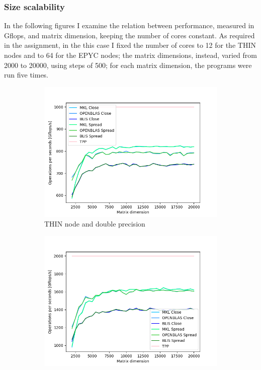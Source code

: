 \documentclass[12pt]{article}
\begin{document}
        
        \subsubsection{Size scalability}
        In the following figures I examine the relation between performance, measured in Gflops, and matrix dimension, keeping the number of cores constant.\newline
        As required in the assignment, in the this case I fixed the number of cores to 12 for the THIN nodes and to 64 for the EPYC nodes; the matrix dimensions, instead, varied from 2000 to 20000, using steps of 500; for each matrix dimension, the programs were run five times.

        \begin{figure}[h]
            \centering
            \begin{subfigure}[b]{0.4\textwidth}
                \includegraphics[width = \textwidth]{figs2/fixed_cores_THIN_d.png}
                \caption{THIN node and double precision}
                \label{fig:fixed_cores_thin_d}
            \end{subfigure}
            \begin{subfigure}[b]{0.4\textwidth}
                \includegraphics[width = \textwidth]{figs2/fixed_cores_THIN_f.png}

\end{subfigure}
\end{figure}
\end{document}
